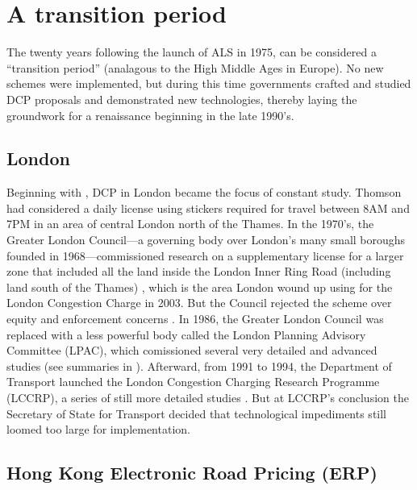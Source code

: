 \section{A transition period}\label{sec:transition}

The twenty years following the launch of ALS in 1975, can be considered a ``transition period'' (analagous to the High Middle Ages in Europe). No new schemes were implemented, but during this time governments crafted and studied DCP proposals and demonstrated new technologies, thereby laying the groundwork for a renaissance beginning in the late 1990's.

\subsection{London}

Beginning with \citet{Thomson1967a}, DCP in London became the focus of constant study. Thomson had considered a daily license using stickers required for travel between 8AM and 7PM in an area of central London north of the Thames. In the 1970's, the Greater London Council---a governing body over London's many small boroughs founded in 1968---commissioned research on a supplementary license for a larger zone that included all the land inside the London Inner Ring Road (including land south of the Thames) \citep{may1975}, which is the area London wound up using for the London Congestion Charge in 2003. But the Council rejected the scheme over equity and enforcement concerns \citep[Ch. XXX]{Richards2006}. In 1986, the Greater London Council was replaced with a less powerful body called the London Planning Advisory Committee (LPAC), which comissioned several very detailed and advanced studies (see summaries in \citet[p. 51-54]{Gomez-Ibanez1994}). Afterward, from 1991 to 1994, the Department of Transport launched the London Congestion Charging Research Programme (LCCRP), a series of still more detailed studies \citep{MVA1995,Richards1996}. But at LCCRP's conclusion the Secretary of State for Transport decided that technological impediments still loomed too large for implementation. 

\subsection{Hong Kong Electronic Road Pricing (ERP)}


